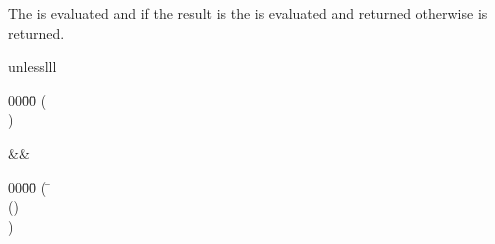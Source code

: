 \begin{optDefinition}
%
\Syntax
{}%
%
\result%
The  is evaluated and if the result is \nil{} the
 is evaluated and returned otherwise \nil{} is returned.
%
\rewriterules
%
\begin{RewriteTable}{unless}{lll}
    \begin{minipage}[t]{0.45\columnwidth}
        \begin{tabbing}
            00\=00\= \kill
            (  \\
            \>)
        \end{tabbing}
    \end{minipage}
    &\rewrite&
    \begin{minipage}[t]{0.45\columnwidth}
        \begin{tabbing}
            00\=00\= \kill
            ( \= \\
            \>\>() \\
            \>)
        \end{tabbing}%
    \end{minipage}%
\end{RewriteTable}


\end{optDefinition}
